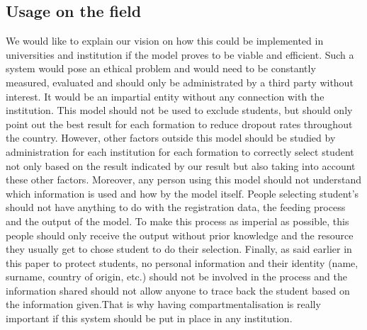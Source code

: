 \documentclass[../main.tex]{subfiles}
\begin{document}
\subsection{Usage on the field}
\label{subsec:concimp_usagefield}
We would like to explain our vision on how this could be implemented in universities and institution if the model proves to be viable and efficient. Such a system would pose an ethical problem and would need to be constantly measured, evaluated and should only be administrated by a third party without interest. It would be an impartial entity without any connection with the institution. 
This model should not be used to exclude students, but should only point out the best result for each formation to reduce dropout rates throughout the country. However, other factors outside this model should be studied by administration for each institution for each formation to correctly select student not only based on the result indicated by our result but also taking into account these other factors. Moreover, any person using this model should not understand which information is used and how by the model itself. People selecting student's should not have anything to do with the registration data, the feeding process and the output of the model. To make this process as imperial as possible, this people should only receive the output without prior knowledge and the resource they usually get to chose student to do their selection.  
Finally, as said earlier in this paper to protect students, no personal information and their identity (name, surname, country of origin, etc.) should not be involved in the process and the information shared should not allow anyone to trace back the student based on the information given.That is why having compartmentalisation is really important if this system should be put in place in any institution.
\end{document}
